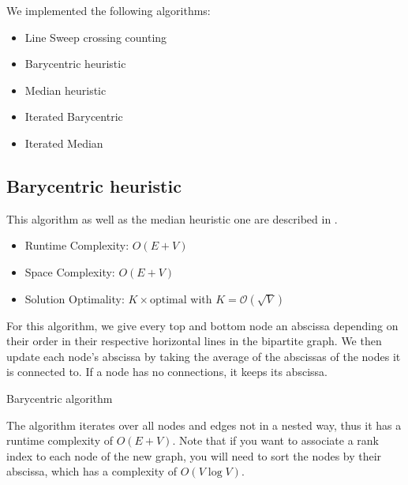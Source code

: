 \documentclass[a4paper]{article}
\begin{document}
We implemented the following algorithms:\\

\begin{itemize}
	\item Line Sweep crossing counting
	\item Barycentric heuristic
	\item Median heuristic
	\item Iterated Barycentric
	\item Iterated Median
\end{itemize}

\subsection{Barycentric heuristic}

This algorithm as well as the median heuristic one are described in \cite{edgecrossings1994}.

\begin{itemize}
	\item Runtime Complexity: $O(E + V)$
	\item Space Complexity: $O(E + V)$
	\item Solution Optimality: $K \times \text{optimal}$ with $K = \mathcal{O}(\sqrt{V})$
\end{itemize}

For this algorithm, we give every top and bottom node an abscissa depending on their order in their respective horizontal lines in the bipartite graph.
We then update each node's abscissa by taking the average of the abscissas of the nodes it is connected to. If a node has no connections, it keeps its abscissa.

\begin{algorithm}[H]
	\caption{Barycentric algorithm}
	\DontPrintSemicolon
	\BlankLine



\end{algorithm}

The algorithm iterates over all nodes and edges not in a nested way, thus it has a runtime complexity of $O(E + V)$.
Note that if you want to associate a rank index to each node of the new graph, you will need to sort the nodes by their abscissa, which has a complexity of $O(V \log V)$.
\end{document}
